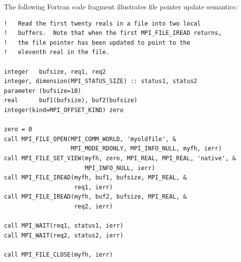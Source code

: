 \begin{example}
\label{io-pointerupdate}
The following Fortran code fragment illustrates file pointer
update semantics:
\begin{lstlisting}[language={[MPI]Fortran}]
!   Read the first twenty reals in a file into two local
!   buffers.  Note that when the first MPI_FILE_IREAD returns,
!   the file pointer has been updated to point to the
!   eleventh real in the file.

integer   bufsize, req1, req2
integer, dimension(MPI_STATUS_SIZE) :: status1, status2
parameter (bufsize=10)
real      buf1(bufsize), buf2(bufsize)
integer(kind=MPI_OFFSET_KIND) zero

zero = 0
call MPI_FILE_OPEN(MPI_COMM_WORLD, 'myoldfile', &
                   MPI_MODE_RDONLY, MPI_INFO_NULL, myfh, ierr)
call MPI_FILE_SET_VIEW(myfh, zero, MPI_REAL, MPI_REAL, 'native', &
                       MPI_INFO_NULL, ierr)
call MPI_FILE_IREAD(myfh, buf1, bufsize, MPI_REAL, &
                    req1, ierr)
call MPI_FILE_IREAD(myfh, buf2, bufsize, MPI_REAL, &
                    req2, ierr)

call MPI_WAIT(req1, status1, ierr)
call MPI_WAIT(req2, status2, ierr)

call MPI_FILE_CLOSE(myfh, ierr)
\end{lstlisting}
\end{example}

